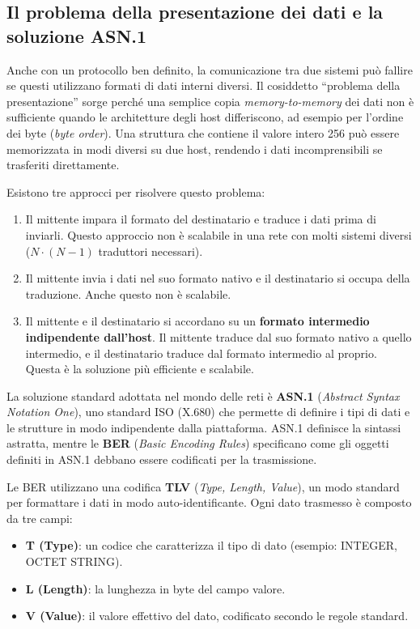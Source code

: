 \subsection{Il problema della presentazione dei dati e la soluzione ASN.1}

Anche con un protocollo ben definito, la comunicazione tra due sistemi può
fallire se questi utilizzano formati di dati interni diversi. Il cosiddetto
``problema della presentazione'' sorge perché una semplice copia
\textit{memory-to-memory} dei dati non è sufficiente quando le architetture
degli host differiscono, ad esempio per l'ordine dei byte (\textit{byte order}).
Una struttura che contiene il valore intero 256 può essere memorizzata in modi
diversi su due host, rendendo i dati incomprensibili se trasferiti direttamente.

Esistono tre approcci per risolvere questo problema:
\begin{enumerate}
\item Il mittente impara il formato del destinatario e traduce i dati prima di
inviarli. Questo approccio non è scalabile in una rete con molti sistemi
diversi (\(N \cdot (N-1)\) traduttori necessari).
\item Il mittente invia i dati nel suo formato nativo e il destinatario si
occupa della traduzione. Anche questo non è scalabile.
\item Il mittente e il destinatario si accordano su un \textbf{formato
intermedio indipendente dall'host}. Il mittente traduce dal suo formato nativo
a quello intermedio, e il destinatario traduce dal formato intermedio al
proprio. Questa è la soluzione più efficiente e scalabile.
\end{enumerate}

La soluzione standard adottata nel mondo delle reti è \textbf{ASN.1}
(\textit{Abstract Syntax Notation One}), uno standard ISO (X.680) che permette
di definire i tipi di dati e le strutture in modo indipendente dalla piattaforma.
ASN.1 definisce la sintassi astratta, mentre le \textbf{BER}
(\textit{Basic Encoding Rules}) specificano come gli oggetti definiti in ASN.1
debbano essere codificati per la trasmissione.

Le BER utilizzano una codifica \textbf{TLV} (\textit{Type, Length, Value}), un
modo standard per formattare i dati in modo auto-identificante.
Ogni dato trasmesso è composto da tre campi:
\begin{itemize}
\item \textbf{T (Type)}: un codice che caratterizza il tipo di dato
(esempio: INTEGER, OCTET STRING).
\item \textbf{L (Length)}: la lunghezza in byte del campo valore.
\item \textbf{V (Value)}: il valore effettivo del dato, codificato secondo le
regole standard.
\end{itemize}

